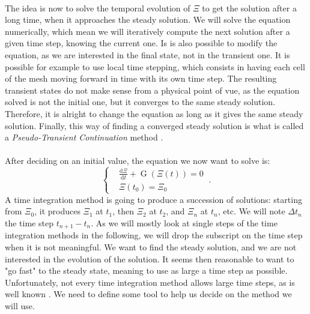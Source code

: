     \paragraph{}
    The idea is now to solve the temporal evolution of $\Xi$ to get the solution after a long time, when it approaches the steady solution.
    We will solve the equation numerically, which mean we will iteratively compute the next solution after a given time step, knowing the current one.
    Is is also possible to modify the equation, as we are interested in the final state, not in the transient one.
    It is possible for example to use local time stepping, which consists in having each cell of the mesh moving forward in time with its own time step.
    The resulting transient states do not make sense from a physical point of vue, as the equation solved is not the initial one, but it converges to the same steady solution.
    Therefore, it is alright to change the equation as long as it gives the same steady solution.
    Finally, this way of finding a converged steady solution is what is called a \emph{Pseudo-Transient Continuation} method \cite{KelleyKeyes1996}.

    \paragraph{}
    After deciding on an initial value, the equation we now want to solve is:
    \begin{equation}\label{eq:init_value_ode}
      \left\{\begin{aligned}
        & \frac{\mathrm{d} \Xi}{\mathrm{d}t} + \operatorname{G}\left(\Xi\left(t\right)\right) = 0 \\
        & \Xi\left(t_0\right) = \Xi_0
      \end{aligned}\right. \ .
    \end{equation}
    A time integration method is going to produce a succession of solutions: starting from $\Xi_0$, it produces $\Xi_1$ at $t_1$, then $\Xi_2$ at $t_2$, and $\Xi_n$ at $t_n$, etc.
    We will note $\Delta t_n$ the time step $t_{n+1} - t_n$.
    As we will mostly look at single steps of the time integration methods in the following, we will drop the subscript on the time step when it is not meaningful.
    We want to find the steady solution, and we are not interested in the evolution of the solution.
    It seems then reasonable to want to "go fast" to the steady state, meaning to use as large a time step as possible.
    Unfortunately, not every time integration method allows large time steps, as is well known \cite{CourantFriedrichsLewy1967}.
    We need to define some tool to help us decide on the method we will use.


